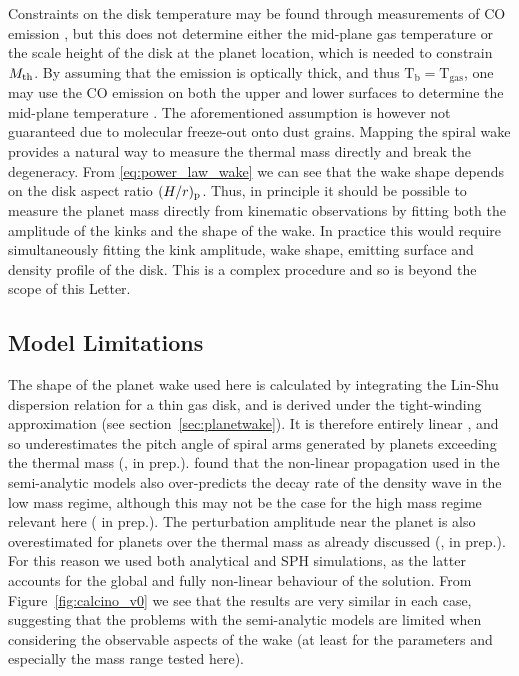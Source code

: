 Constraints on the disk temperature may be found through measurements of CO emission \citep[e.g.][]{pinte2018},
but this does not determine either the mid-plane gas temperature or the scale height of the disk at the planet location, which is needed to constrain $M_{\rm th}$.
By assuming that the emission is optically thick, and thus $\mathrm{T_b}=\mathrm{T_{gas}}$, one may use the CO emission on both the upper and lower surfaces to determine the mid-plane temperature \citep{dullemond2020}.
The aforementioned assumption is however not guaranteed due to molecular freeze-out onto dust grains.
Mapping the spiral wake provides a natural way to measure the thermal mass directly and break the degeneracy.
From \ref{eq:power_law_wake} we can see that the wake shape depends on the disk aspect ratio $(H/r)_{\rm p}$.
Thus, in principle it should be possible to measure the planet mass directly from kinematic observations by fitting both the amplitude of the kinks and the shape of the wake.
In practice this would require simultaneously fitting the kink amplitude, wake shape, emitting surface and density profile of the disk.
This is a complex procedure and so is beyond the scope of this Letter.
%
\subsection{Model Limitations} \label{sec:limitations}

The shape of the planet wake used here is calculated by integrating the Lin-Shu dispersion relation for a thin gas disk, and is derived under the tight-winding approximation (see section~\ref{sec:planetwake}).
It is therefore entirely linear \citep{ogilvie2002}, and so underestimates the pitch angle of spiral arms generated by planets exceeding the thermal mass (\citealt{zhu2015,bae2018a,cimerman2021}, \citeauthor{fasanoinprep.} in prep.).
\citet{cimerman2021} found that the non-linear propagation used in the semi-analytic models also over-predicts the decay rate of the density wave in the low mass regime, although this may not be the case for the high mass regime relevant here (\citeauthor{fasanoinprep.} in prep.).
The perturbation amplitude near the planet is also overestimated for planets over the thermal mass as already discussed (\citealt{goodman2001}, \citeauthor{fasanoinprep.} in prep.).
For this reason we used both analytical and SPH simulations, as the latter accounts for the global and fully non-linear behaviour of the solution.
From Figure~\ref{fig:calcino_v0} we see that the results are very similar in each case, suggesting that the problems with the semi-analytic models are limited when considering the observable aspects of the wake (at least for the parameters and especially the mass range tested here).

